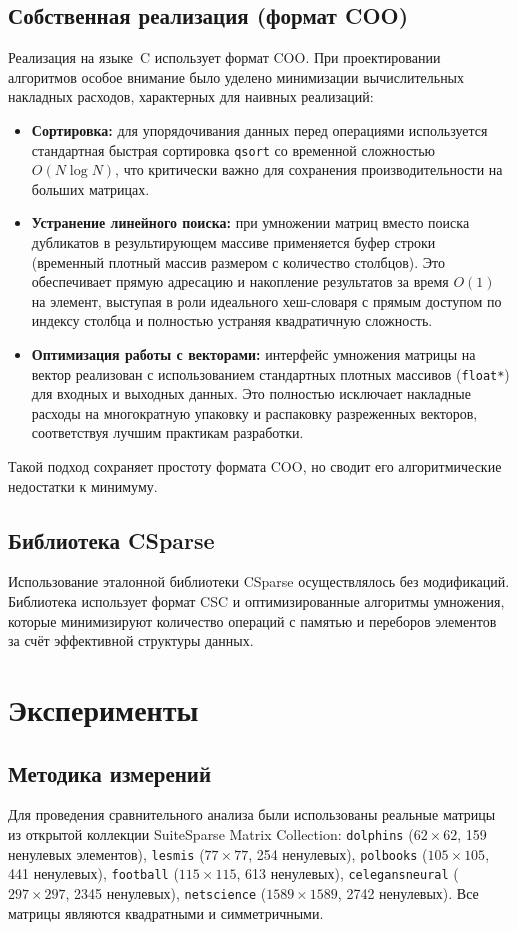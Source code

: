 \documentclass[a4paper]{article}
\begin{document}
\subsection{Собственная реализация (формат COO)}
Реализация на языке~C использует формат COO. При проектировании алгоритмов особое внимание было уделено минимизации вычислительных накладных расходов, характерных для наивных реализаций:
\begin{itemize}
    \item \textbf{Сортировка:} для упорядочивания данных перед операциями используется стандартная быстрая сортировка \texttt{qsort} со временной сложностью $O(N \log N)$, что критически важно для сохранения производительности на больших матрицах.
    \item \textbf{Устранение линейного поиска:} при умножении матриц вместо поиска дубликатов в результирующем массиве применяется буфер строки (временный плотный массив размером с количество столбцов). Это обеспечивает прямую адресацию и накопление результатов за время $O(1)$ на элемент, выступая в роли идеального хеш-словаря с прямым доступом по индексу столбца и полностью устраняя квадратичную сложность.
    \item \textbf{Оптимизация работы с векторами:} интерфейс умножения матрицы на вектор реализован с использованием стандартных плотных массивов (\texttt{float*}) для входных и выходных данных. Это полностью исключает накладные расходы на многократную упаковку и распаковку разреженных векторов, соответствуя лучшим практикам разработки.
\end{itemize}
Такой подход сохраняет простоту формата COO, но сводит его алгоритмические недостатки к минимуму.

\subsection{Библиотека CSparse}
Использование эталонной библиотеки CSparse осуществлялось без модификаций. Библиотека использует формат CSC и оптимизированные алгоритмы умножения, которые минимизируют количество операций с памятью и переборов элементов за счёт эффективной структуры данных.

\section{Эксперименты}

\subsection{Методика измерений}
Для проведения сравнительного анализа были использованы реальные матрицы из открытой коллекции SuiteSparse Matrix Collection: \texttt{dolphins} ($62 \times 62$, 159 ненулевых элементов), \texttt{lesmis} ($77 \times 77$, 254 ненулевых), \texttt{polbooks} ($105 \times 105$, 441 ненулевых), \texttt{football} ($115 \times 115$, 613 ненулевых), \texttt{celegansneural} ($297 \times 297$, 2345 ненулевых), \texttt{netscience} ($1589 \times 1589$, 2742 ненулевых). Все матрицы являются квадратными и симметричными.
\end{document}
